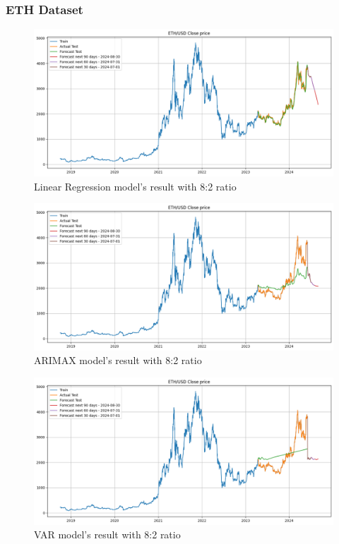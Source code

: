 \documentclass{ieeeojies}
\begin{document}
\subsubsection{ETH Dataset}
\begin{figure}[H]
    \centering 
    \includegraphics[width=0.8\linewidth]{./././visualize/LinearRegression/ETH-80-20.png} 
    \caption{Linear Regression model’s result with 8:2 ratio}
    \label{fig:21}
\end{figure}
\begin{figure}[H]
    \centering 
    \includegraphics[width=0.8\linewidth]{./././visualize/ARIMAX/ETH-80-20.png} 
    \caption{ARIMAX model’s result with 8:2 ratio}
    \label{fig:22}
\end{figure}
\begin{figure}[H]
    \centering 
    \includegraphics[width=0.8\linewidth]{./././visualize/VAR/ETH-80-20.png} 
    \caption{VAR model’s result with 8:2 ratio}
    \label{fig:23}
\end{figure}
\end{document}
